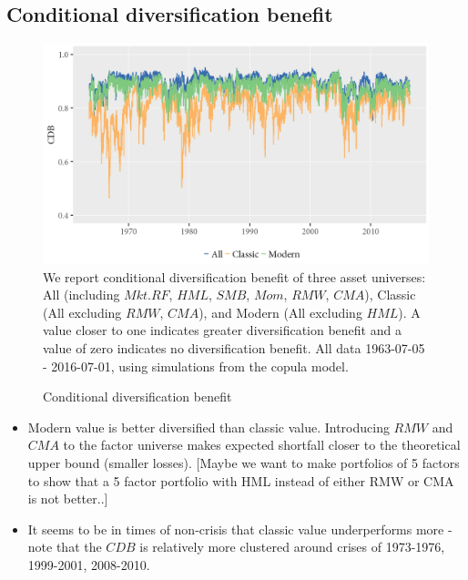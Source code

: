 \subsection{Conditional diversification benefit}
\begin{figure}[H]
  \caption{Conditional diversification benefit}
  \label{diag:cdb1}
  \toprule
  \centering
  \begin{minipage}{\textwidth}
  \includegraphics[scale=1]{graphics/CDB_dynamic_ghskt.png}  
  \bottomrule
  \vspace{3mm}
  \footnotesize
  We report conditional diversification benefit of three asset universes: All (including $Mkt.RF$, $HML$, $SMB$, $Mom$, $RMW$, $CMA$), Classic (All excluding $RMW$, $CMA$), and Modern (All excluding $HML$). A value closer to one indicates greater diversification benefit and a value of zero indicates no diversification benefit. All data 1963-07-05 - 2016-07-01, using simulations from the copula model.
  \end{minipage}
\end{figure}
\begin{itemize}
  \item Modern value is better diversified than classic value. Introducing $RMW$ and $CMA$ to the factor universe makes expected shortfall closer to the theoretical upper bound (smaller losses). [Maybe we want to make portfolios of 5 factors to show that a 5 factor portfolio with HML instead of either RMW or CMA is not better..]
  \item It seems to be in times of non-crisis that classic value underperforms more - note that the $CDB$ is relatively more clustered around crises of 1973-1976, 1999-2001, 2008-2010.
\end{itemize}